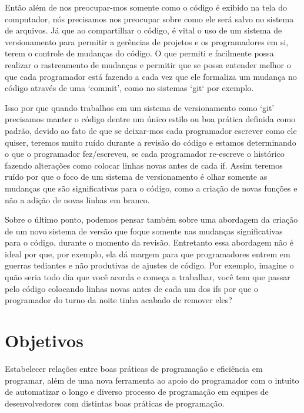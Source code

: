     Então além de nos preocupar-mos somente como o código é exibido na tela do computador, nós
    precisamos nos preocupar sobre como ele será salvo no sistema de arquivos. Já que ao
    compartilhar o código, é vital o uso de um sistema de versionamento para permitir a gerências de
    projetos e os programadores em si, terem o controle de mudanças do código. O que permiti e
    facilmente possa realizar o rastreamento de mudanças e permitir que se possa entender melhor o
    que cada programador está fazendo a cada vez que ele formaliza um mudança no código através de
    uma `commit', como no sistemas `git` por exemplo.

    Isso por que quando trabalhos em um sistema de versionamento como `git' precisamos manter o
    código dentre um único estilo ou boa prática definida como padrão, devido ao fato de que se
    deixar-mos cada programador escrever como ele quiser, teremos muito ruído durante a revisão do
    código e estamos determinando o que o programador fez/escreveu, se cada programador re-escreve o
    histórico fazendo alterações como colocar linhas novas antes de cada if. Assim teremos ruído por
    que o foco de um sistema de versionamento é olhar somente as mudanças que são significativas
    para o código, como a criação de novas funções e não a adição de novas linhas em branco.

    Sobre o último ponto, podemos pensar também sobre uma abordagem da criação de um novo sistema de
    versão que foque somente nas mudanças significativas para o código, durante o momento da
    revisão. Entretanto essa abordagem não é ideal por que, por exemplo, ela dá margem para que
    programadores entrem em guerras tediantes e não produtivas de ajustes de código. Por exemplo,
    imagine o quão seria todo dia que você acorda e começa a trabalhar, você tem que passar pelo
    código colocando linhas novas antes de cada um dos if\textquotesingle s por que o programador do
    turno da noite tinha acabado de remover eles?


\section{Objetivos}

    Estabelecer relações entre boas práticas de programação e eficiência em programar, além de uma
    nova ferramenta ao apoio do programador com o intuito de automatizar o longo e diverso processo
    de programação em equipes de desenvolvedores com distintas boas práticas de programação.

